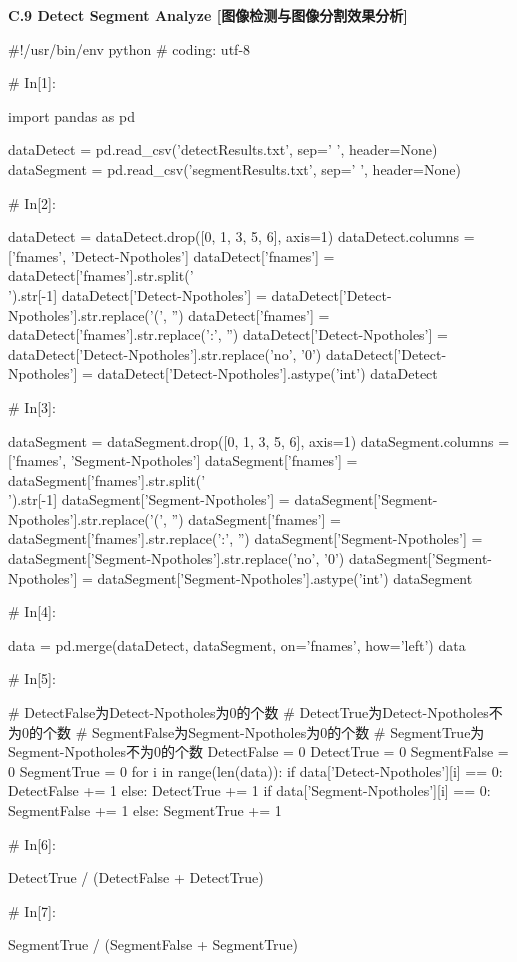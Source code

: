 \documentclass{MathorCupmodeling}
\begin{document}
\textbf{C.9 Detect Segment Analyze [图像检测与图像分割效果分析]}
\begin{python}
#!/usr/bin/env python
# coding: utf-8

# In[1]:


import pandas as pd

dataDetect = pd.read_csv('detectResults.txt', sep=' ', header=None)
dataSegment = pd.read_csv('segmentResults.txt', sep=' ', header=None)

# In[2]:


dataDetect = dataDetect.drop([0, 1, 3, 5, 6], axis=1)
dataDetect.columns = ['fnames', 'Detect-Npotholes']
dataDetect['fnames'] = dataDetect['fnames'].str.split('\\').str[-1]
dataDetect['Detect-Npotholes'] = dataDetect['Detect-Npotholes'].str.replace('(', '')
dataDetect['fnames'] = dataDetect['fnames'].str.replace(':', '')
dataDetect['Detect-Npotholes'] = dataDetect['Detect-Npotholes'].str.replace('no', '0')
dataDetect['Detect-Npotholes'] = dataDetect['Detect-Npotholes'].astype('int')
dataDetect

# In[3]:


dataSegment = dataSegment.drop([0, 1, 3, 5, 6], axis=1)
dataSegment.columns = ['fnames', 'Segment-Npotholes']
dataSegment['fnames'] = dataSegment['fnames'].str.split('\\').str[-1]
dataSegment['Segment-Npotholes'] = dataSegment['Segment-Npotholes'].str.replace('(', '')
dataSegment['fnames'] = dataSegment['fnames'].str.replace(':', '')
dataSegment['Segment-Npotholes'] = dataSegment['Segment-Npotholes'].str.replace('no', '0')
dataSegment['Segment-Npotholes'] = dataSegment['Segment-Npotholes'].astype('int')
dataSegment

# In[4]:


data = pd.merge(dataDetect, dataSegment, on='fnames', how='left')
data

# In[5]:


# DetectFalse为Detect-Npotholes为0的个数
# DetectTrue为Detect-Npotholes不为0的个数
# SegmentFalse为Segment-Npotholes为0的个数
# SegmentTrue为Segment-Npotholes不为0的个数
DetectFalse = 0
DetectTrue = 0
SegmentFalse = 0
SegmentTrue = 0
for i in range(len(data)):
    if data['Detect-Npotholes'][i] == 0:
        DetectFalse += 1
    else:
        DetectTrue += 1
    if data['Segment-Npotholes'][i] == 0:
        SegmentFalse += 1
    else:
        SegmentTrue += 1

# In[6]:


DetectTrue / (DetectFalse + DetectTrue)

# In[7]:


SegmentTrue / (SegmentFalse + SegmentTrue)
\end{python}
\end{document}
